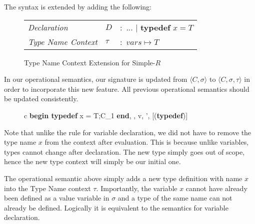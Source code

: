 \documentclass[a4paper,12pt]{report}
\begin{document}
\par
The syntax is extended by adding the following: 
\begin{figure}[H]
  \begin{center}
    \begin{tabular} {l l l}
      \textit{Declaration} & $D$ & $:$ ... $|$ \textbf{typedef }$x = T$\\
      \textit{Type Name Context} & $\tau$& $:$ $vars \mapsto T$ \\
    \end{tabular}
  \end{center}
  \caption{Type Name Context Extension for Simple-$R$}
\end{figure}

\par
In our operational semantics, our signature is updated from $\langle C, \sigma \rangle$ 
to $\langle C, \sigma, \tau \rangle$ in order to incorporate this new feature. 
All previous operational semantics should be updated consistently.

\begin{figure}[H]
  \begin{center}
    \begin{tabular} {c}
      {\langle \textbf{begin typedef }x = T;C_1\textbf{ end}, 
      \sigma, \tau \rangle \longrightarrow 
        \langle v, \sigma', \tau \rangle}[(\textbf{typedef})] \text{ }    
    \end{tabular}
  \end{center}
\end{figure}

\par
Note that unlike the rule for variable declaration, we did not have to remove 
the type name $x$ from the context after evaluation. This is because unlike 
variables, types cannot change after declaration. The new type simply goes 
out of scope, hence the new type context will simply be our initial one. 

\par
The operational semantic above simply adds a new type definition with name $x$ 
into the Type Name context $\tau$. Importantly, the variable $x$ cannot have 
already been defined as a value variable in $\sigma$ and a type of the same name 
can not already be defined. Logically it is equivalent to the semantics for 
variable declaration.
\end{document}
